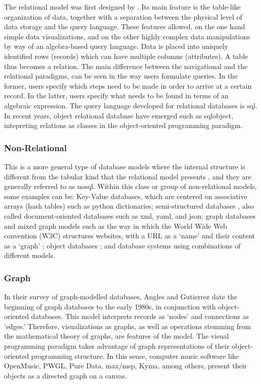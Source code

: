 The relational model was first designed by \textcites{Codd:1970:RMD:362384.362685}{Codd72relationalcompleteness}. Its main feature is the table-like organization of data, together with a separation between the physical level of data storage and the query language. These features allowed, on the one hand simple data visualizations, and on the other highly complex data manipulations by way of an algebra-based query language. Data is placed into uniquely identified rows (records) which can have multiple columns (attributes). A table thus becomes a relation. The main difference between the navigational and the relational paradigms, can be seen in the way users formulate queries. In the former, users specify which steps need to be made in order to arrive at a certain record. In the latter, users specify what needs to be found in terms of an algebraic expression. The query language developed for relational databases is \gls{sql}. In recent years, object relational database have emerged such as \gls{sqlobject}, intepreting relations as classes in the object-oriented programming paradigm.

\subsubsection{Non-Relational}
\label{model:nonrelational}

This is a more general type of database models where the internal structure is different from the tabular kind that the relational model presents , and they are generally referred to as \gls{nosql}. Within this class or group of non-relational models, some examples can be: Key-Value databases, which are centered on associative arrays (hash tables) such as python dictionaries; semi-structured databases , also called document-oriented databases such as \gls{xml}, \gls{yaml}, and \gls{json}; graph databases and mixed graph models such as the way in which the World Wide Web convention (W3C) structures websites, with a URL as a `name' and their content as a `graph' ; object databases ; and database systems using combinations of different models.

\subsubsection{Graph}
\label{model:graph}

In their survey of graph-modelled databases, Angles and Gutierrez \parencite{2008:graph/anglesgutierrez/survey} date the beginning of graph databases to the early 1980s, in conjunction with object-oriented databases. This model interprets records as `nodes' and connections as `edges.' Therefore, visualizations as graphs, as well as operations stemming from the mathematical theory of graphs, are features of the model. The visual programming paradigm takes advantage of graph representations of their object-oriented programming structure. In this sense, computer music software like OpenMusic, PWGL, Pure Data, \gls{max/msp}, Kyma, among others, present their objects as a directed graph on a canvas.

